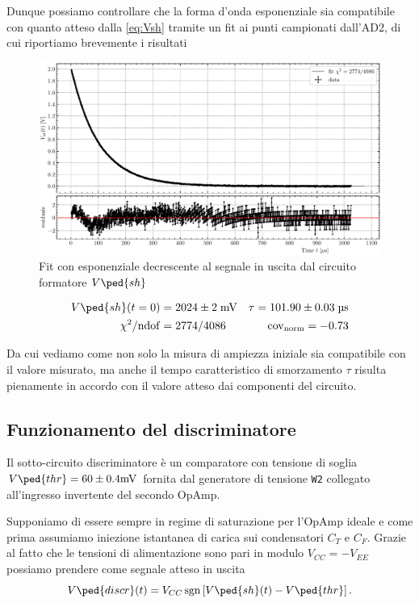 \documentclass[10pt,a4paper]{article}
\begin{document}
Dunque possiamo controllare che la forma d'onda esponenziale sia compatibile
con quanto atteso dalla \eqref{eq:Vsh} tramite un fit ai punti campionati
dall'AD2, di cui riportiamo brevemente i risultati
\begin{figure}[htbp]
    \centering
	\includegraphics[scale=0.6]{tau}
    \caption{Fit con esponenziale decrescente al segnale in uscita dal
    circuito formatore $V\ped{sh}$ \label{fig: tau}}
\end{figure}
\begin{align*}
V\ped{sh} (t=0) &= 2024 \pm 2 \; \si{m\V}
&\tau = 101.90 \pm 0.03 \; \si{\micro\s} \\
\chi^2/\mathrm{ndof} &= 2774/4086 &\mathrm{cov_{norm}} = -0.73
\end{align*}

Da cui vediamo come non solo la misura di ampiezza iniziale sia compatibile
con il valore misurato, ma anche il tempo caratteristico di smorzamento $\tau$
risulta pienamente in accordo con il valore atteso dai componenti del
circuito.

\setcounter{subsection}{3}
\subsection{Funzionamento del discriminatore}
Il sotto-circuito discriminatore è un comparatore con tensione di soglia
$V\ped{thr} = 60 \pm 0.4 \si{m\V}$ fornita dal generatore di tensione
\verb+W2+ collegato all'ingresso invertente del secondo OpAmp.

Supponiamo di essere sempre in regime di saturazione per l'OpAmp ideale e
come prima assumiamo iniezione istantanea di carica sui condensatori $C_T$ e
$C_F$. Grazie al fatto che le tensioni di alimentazione sono pari in modulo
$V_{CC} = - V_{EE}$ possiamo prendere come segnale atteso in uscita
\begin{equation}\label{eq: Vdiscr}
V\ped{discr} (t) = V_{CC} \sgn\left[V\ped{sh}(t) - V\ped{thr}\right].
\end{equation}
\end{document}
